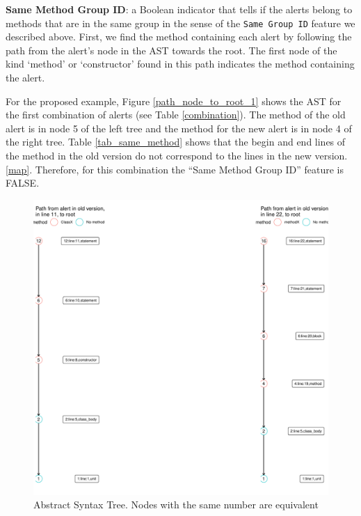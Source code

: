 \documentclass[
]{article}
\begin{document}
%
%
\noindent \textbf{Same Method Group ID}: a Boolean indicator
that tells if the alerts belong to methods that are in the same group in
the sense of the \texttt{Same Group ID} feature we described above. First, 
we find the method containing each alert by following the path from the 
alert's node in the AST towards the root. The first node of the kind `method'
or `constructor' found in this path indicates the method containing the alert.

For the proposed example, Figure \ref{path_node_to_root_1} shows
the AST for the first combination of alerts (see Table
\ref{combination}). The method of the old alert is in node 5 of the
left tree and the method for the new alert is in node 4 of the right
tree. Table \ref{tab_same_method} shows that the begin and end lines of
the method in the old version do not correspond to the lines in the new
version. %
\ref{map}. 
Therefore, for this combination the ``Same Method Group ID'' feature is
FALSE.

\small

\begin{figure}[H]
\includegraphics[width=1\linewidth]{report_files/figure-latex/unnamed-chunk-8-1} \caption{Abstract Syntax Tree. Nodes with the same number are equivalent \label{path_node_to_root_1}}\label{fig:unnamed-chunk-8}
\end{figure}
\end{document}
